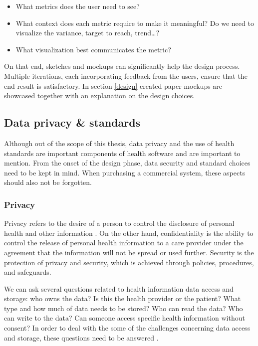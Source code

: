     \begin{itemize}
        \item What metrics does the user need to see?
        \item What context does each metric require to make it meaningful? Do we need to visualize the variance, target to reach, trend\ldots?
        \item What visualization best communicates the metric?
    \end{itemize}

    \noindent On that end, sketches and mockups can significantly help the design process. Multiple iterations, each incorporating feedback from the users, ensure that the end result is satisfactory. In section \ref{design} created paper mockups are showcased together with an explanation on the design choices.

    \subsection{Data privacy \& standards}
        
    Although out of the scope of this thesis, data privacy and the use of health standards are important components of health software and are important to mention. From the onset of the design phase, data security and standard choices need to be kept in mind. When purchasing a commercial system, these aspects should also not be forgotten.

        \subsubsection{Privacy} \label{2_privacy}

        Privacy refers to the desire of a person to control the disclosure of personal health and other information \cite{biomedical_informatics}. On the other hand, confidentiality is the ability to control the release of personal health information to a care provider under the agreement that the information will not be spread or used further. Security is the protection of privacy and security, which is achieved through policies, procedures, and safeguards.

        We can ask several questions related to health information data access and storage: who owns the data? Is this the health provider or the patient? What type and how much of data needs to be stored? Who can read the data? Who can write to the data? Can someone access specific health information without consent? In order to deal with the some of the challenges concerning data access and storage, these questions need to be answered \cite{meingast2006security}.

